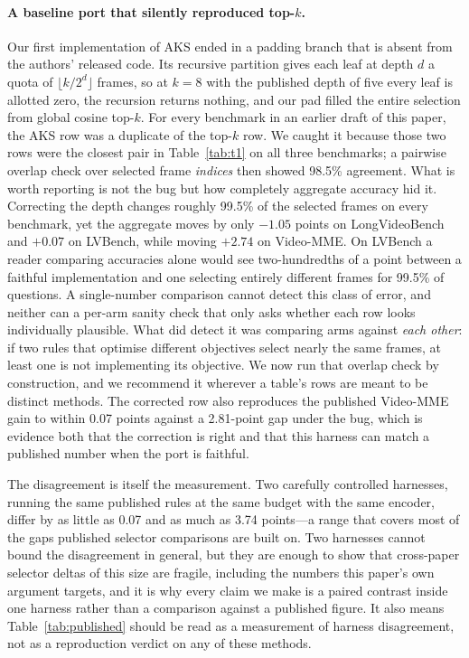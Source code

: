 \documentclass[11pt]{article}
\begin{document}
\paragraph{A baseline port that silently reproduced top-$k$.}
Our first implementation of AKS ended in a padding branch that is absent from the authors' released code.
Its recursive partition gives each leaf at depth $d$ a quota of $\lfloor k/2^{d}\rfloor$ frames, so at $k{=}8$ with the published depth of five every leaf is allotted zero, the recursion returns nothing, and our pad filled the entire selection from global cosine top-$k$.
For every benchmark in an earlier draft of this paper, the AKS row was a duplicate of the top-$k$ row.
We caught it because those two rows were the closest pair in Table~\ref{tab:t1} on all three benchmarks; a pairwise overlap check over selected frame \emph{indices} then showed 98.5\% agreement.
What is worth reporting is not the bug but how completely aggregate accuracy hid it.
Correcting the depth changes roughly 99.5\% of the selected frames on every benchmark, yet the aggregate moves by only $-1.05$ points on LongVideoBench and $+0.07$ on LVBench, while moving $+2.74$ on Video-MME.
On LVBench a reader comparing accuracies alone would see two-hundredths of a point between a faithful implementation and one selecting entirely different frames for 99.5\% of questions.
A single-number comparison cannot detect this class of error, and neither can a per-arm sanity check that only asks whether each row looks individually plausible.
What did detect it was comparing arms against \emph{each other}: if two rules that optimise different objectives select nearly the same frames, at least one is not implementing its objective.
We now run that overlap check by construction, and we recommend it wherever a table's rows are meant to be distinct methods.
The corrected row also reproduces the published Video-MME gain to within 0.07 points against a 2.81-point gap under the bug, which is evidence both that the correction is right and that this harness can match a published number when the port is faithful.

The disagreement is itself the measurement.
Two carefully controlled harnesses, running the same published rules at the same budget with the same encoder, differ by as little as 0.07 and as much as 3.74 points---a range that covers most of the gaps published selector comparisons are built on.
Two harnesses cannot bound the disagreement in general, but they are enough to show that cross-paper selector deltas of this size are fragile, including the numbers this paper's own argument targets, and it is why every claim we make is a paired contrast inside one harness rather than a comparison against a published figure.
It also means Table~\ref{tab:published} should be read as a measurement of harness disagreement, not as a reproduction verdict on any of these methods.
\end{document}
